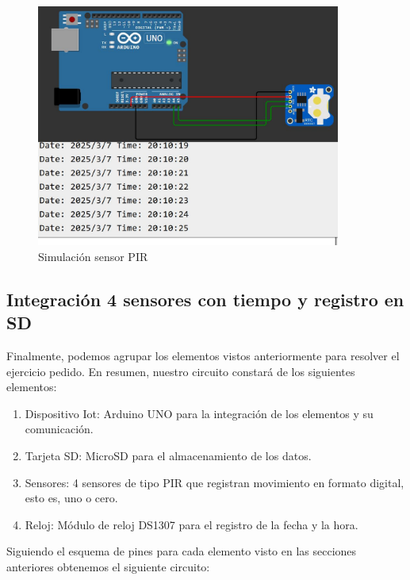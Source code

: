 \begin{figure}[H]
    \centering
    \includegraphics[width = 10cm]{ImagenesLatex/rtc.JPG}{}
    \caption{Simulación sensor PIR}
\end{figure}

\subsection{Integración 4 sensores con tiempo y registro en SD}
Finalmente, podemos agrupar los elementos vistos anteriormente para resolver el ejercicio pedido. En resumen, nuestro circuito constará de los siguientes elementos:
\begin{enumerate}
    \item Dispositivo Iot: Arduino UNO para la integración de los elementos y su comunicación.
    \item Tarjeta SD: MicroSD para el almacenamiento de los datos.
    \item Sensores: 4 sensores de tipo PIR que registran movimiento en formato digital, esto es, uno o cero.
    \item Reloj: Módulo de reloj DS1307 para el registro de la fecha y la hora.
\end{enumerate}
Siguiendo el esquema de pines para cada elemento visto en las secciones anteriores obtenemos el siguiente circuito:

